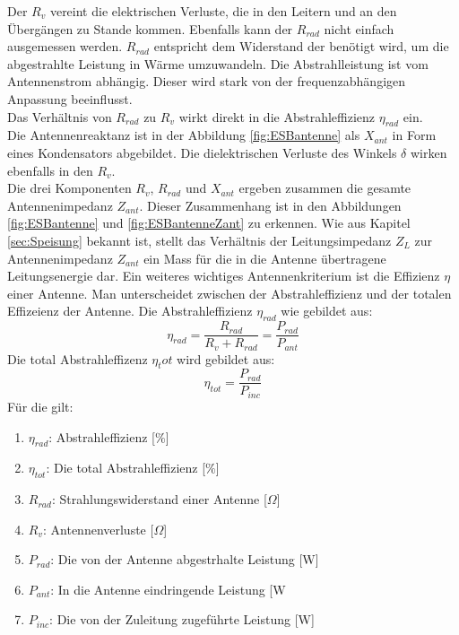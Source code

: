 \newpage
Der $R_{v}$ vereint die elektrischen Verluste, die in den Leitern und an den Übergängen zu Stande kommen. Ebenfalls kann der $R_{rad}$ nicht einfach ausgemessen werden. $R_{rad}$ entspricht dem Widerstand der benötigt wird, um die abgestrahlte Leistung in Wärme umzuwandeln. Die Abstrahlleistung ist vom Antennenstrom abhängig. Dieser wird stark von der frequenzabhängigen Anpassung beeinflusst.\\
Das Verhältnis von $R_{rad}$ zu $R_{v}$ wirkt direkt in die Abstrahleffizienz $\eta_{rad}$ ein. \\
Die Antennenreaktanz ist in der Abbildung \ref{fig:ESBantenne} als $X_{ant}$ in Form eines Kondensators abgebildet. Die dielektrischen Verluste des Winkels $\delta$ wirken ebenfalls in den $R_{v}$.\\
Die drei Komponenten $R_{v}$, $R_{rad}$ und $X_{ant}$ ergeben zusammen die gesamte Antennenimpedanz $Z_{ant}$. Dieser Zusammenhang ist in den Abbildungen \ref{fig:ESBantenne} und \ref{fig:ESBantenneZant} zu erkennen. Wie aus Kapitel \ref{sec:Speisung} bekannt ist, stellt das Verhältnis der Leitungsimpedanz $Z_L$ zur Antennenimpedanz $Z_{ant}$ ein Mass für die in die Antenne übertragene Leitungsenergie dar. Ein weiteres wichtiges Antennenkriterium ist die Effizienz $\eta$ einer Antenne. Man unterscheidet zwischen der Abstrahleffizienz und der totalen Effizeienz der Antenne. Die Abstrahleffizienz $\eta_{rad}$ wie gebildet aus:
\begin{equation}
\eta_{rad}=\dfrac{R_{rad}}{R_v + R_{rad}}=\dfrac{P_{rad}}{P_{ant}}
\label{eq:eta_rad}
\end{equation}
Die total Abstrahleffizenz $\eta_tot$ wird gebildet aus:
\begin{equation}
\eta_{tot}=\dfrac{P_{rad}}{P_{inc}}
\label{eq:eta_tot}
\end{equation}
Für die gilt:
\begin{enumerate}[leftmargin=2cm]
 \item[] $\eta_{rad}$: Abstrahleffizienz [$\%$] 
 \item[] $\eta_{tot}$: Die total Abstrahleffizienz [$\%$] 
 \item[] $R_{rad}$: Strahlungswiderstand einer Antenne [$\Omega$] 
 \item[] $R_v$: Antennenverluste [$\Omega$] 
 \item[] $P_{rad}$: Die von der Antenne abgestrhalte Leistung [W] 
 \item[] $P_{ant}$: In die Antenne eindringende Leistung [W 
 \item[] $P_{inc}$: Die von der Zuleitung zugeführte Leistung [W] 
\end{enumerate} 

